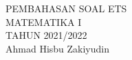 \documentclass{article}
\begin{document}
 \begin{titlepage}
    \vspace*{\fill}
    \begin{center}
      \Huge {PEMBAHASAN SOAL ETS \\ MATEMATIKA I \\ TAHUN 2021/2022}\\[0.4 cm]
      \huge {Ahmad Hisbu Zakiyudin}
    \end{center}
    \vspace*{\fill}
  \end{titlepage}
\makeatletter
\renewcommand*\env@matrix[1][*\c@MaxMatrixCols c]{%
  \hskip -\arraycolsep
  \let\@ifnextchar\new@ifnextchar
  \array{#1}}
\makeatother
\newcount\arrowcount
\newcommand\arrows[1]{
        \global\arrowcount#1
        \ifnum\arrowcount>0
                \begin{matrix}[c]
                \expandafter\nextarrow
        \fi
}
 
\newcommand\nextarrow[1]{
        \global\advance\arrowcount-1
        \ifx\relax#1\relax\else \xrightarrow{#1}\fi
        \ifnum\arrowcount=0
                \end{matrix}
        \else
                \\
                \expandafter\nextarrow
        \fi
}
\newpage
{}
\end{document}
